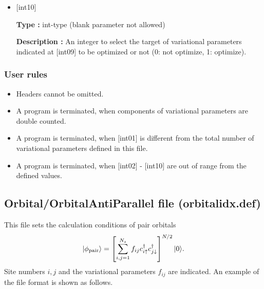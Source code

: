 \begin{itemize}
  {\bf Description :} 
  An integer giving kinds of variational  parameters. The value is $(2n+s)\times$[int01]$+t$, where $n$, $s$ and $t$ are given by the following relation:
  \begin{itemize}
  \item{$n$}: The number of doublon (holon) around the center site (0, 1, 2, 3, 4),  \\
  \item{$s$}: When the center is doublon (holon), s=0 (1), \\
  \item{$t$}: The kind of variational parameters (0, $\cdots$ [int1]-1).
  \end{itemize}  
  
 \item  $[$int10$]$
   
   {\bf Type :} int-type (blank parameter not allowed)

  {\bf Description :} An integer to select the target of variational parameters indicated at [int09] to be optimized or not (0: not optimize, 1: optimize).
  
\end{itemize}

\subsubsection{User rules}
\begin{itemize}
\item Headers cannot be omitted. 
\item A program is terminated, when components of variational parameters are double counted.
\item A program is terminated, when $[$int01$]$ is different from the total number of variational parameters defined in this file.
\item A program is terminated, when $[$int02$]$ - $[$int10$]$ are out of range from the defined values.
\end{itemize}

\newpage
\subsection{Orbital/OrbitalAntiParallel file (orbitalidx.def)}
\label{Subsec:Orbital}
This file sets the calculation conditions of pair orbitals
\begin{equation}
|\phi_{\rm pair} \rangle = \left[\sum_{i, j=1}^{N_s} f_{ij}c_{i\uparrow}^{\dag}c_{j\downarrow}^{\dag} \right]^{N/2}|0 \rangle.
\end{equation}
Site numbers $i, j$ and the variational parameters $f_{ij}$ are indicated.
An example of the file format is shown as follows.

